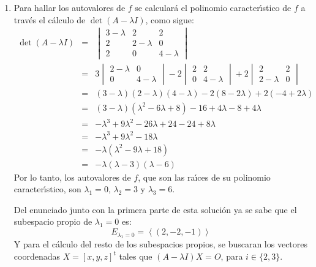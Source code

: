 \begin{solucion}
\begin{enumerate}[$a$)]
  \item Para hallar los autovalores de $f$ se calcular\'a el polinomio caracter\'{\i}stico de $f$ a trav\'es el c\'alculo de $\det(A - \lambda I)$, como sigue:
  \begin{eqnarray*}
   \det(A - \lambda I) & = & 
   \begin{vmatrix}
    3 - \lambda & 2 & 2 \\
    2 & 2 - \lambda & 0 \\
    2 & 0 & 4 - \lambda
   \end{vmatrix}
   \\
   & = & 
   3
   \begin{vmatrix}
    2 - \lambda & 0 \\
    0 & 4 - \lambda 
   \end{vmatrix}
   -2
   \begin{vmatrix}
    2 & 2 \\
    0 & 4 - \lambda 
   \end{vmatrix}
   +2
   \begin{vmatrix}
    2 & 2 \\
    2 - \lambda & 0
   \end{vmatrix}
   \\
   & = & 
   (3-\lambda)(2-\lambda)(4-\lambda) -2(8 - 2\lambda) +2(-4 + 2\lambda) \\
   & = & 
   (3-\lambda)(\lambda^2 - 6\lambda + 8) - 16 + 4\lambda -8 + 4\lambda \\
   & = & 
   -\lambda^3 +9\lambda^2 - 26\lambda + 24 - 24 + 8\lambda \\
   & = & 
   -\lambda^3 + 9\lambda^2 - 18\lambda \\
   & = & -\lambda(\lambda^2 - 9\lambda + 18) \\
   & = & -\lambda(\lambda - 3)(\lambda - 6)
  \end{eqnarray*}
  Por lo tanto, los autovalores de $f$, que son las ra\'{\i}ces de su polinomio caracter\'{\i}stico, son $\lambda_1 = 0$, $\lambda_2 = 3$ y $\lambda_3 = 6$.
  \par 
  Del enunciado junto con la primera parte de esta soluci\'on ya se sabe que el subespacio propio de $\lambda_1 = 0$ es:
  \begin{equation*}
   E_{\lambda_1 = 0} = \left< (2, -2, -1) \right>
  \end{equation*}
  Y para el c\'alculo del resto de los subespacios propios, se buscaran los vectores coordenadas $X = [x,y,z]^t$ tales que $(A - \lambda I)X = O$, para $i \in \{2,3 \}$.
  \par 

\end{enumerate}
\end{solucion}
